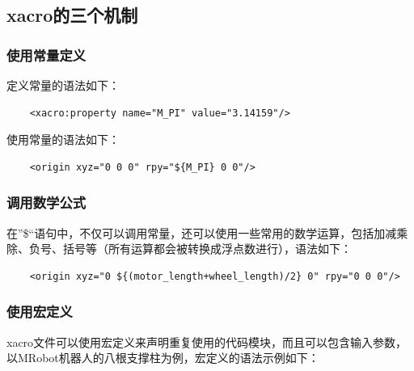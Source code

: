 \documentclass[10pt, oneside]{book}
\begin{document}
\subsection{xacro的三个机制}

\subsubsection{使用常量定义}

定义常量的语法如下：

\begin{verbatim}
    <xacro:property name="M_PI" value="3.14159"/>
\end{verbatim}

使用常量的语法如下：

\begin{verbatim}
    <origin xyz="0 0 0" rpy="${M_PI} 0 0"/>
\end{verbatim}

\subsubsection{调用数学公式}

在”\${}“语句中，不仅可以调用常量，还可以使用一些常用的数学运算，包括加减乘除、负号、括号等（所有运算都会被转换成浮点数进行），语法如下：

\begin{verbatim}
    <origin xyz="0 ${(motor_length+wheel_length)/2} 0" rpy="0 0 0"/>
\end{verbatim}

\subsubsection{使用宏定义}

xacro文件可以使用宏定义来声明重复使用的代码模块，而且可以包含输入参数，以MRobot机器人的八根支撑柱为例，宏定义的语法示例如下：
\end{document}
